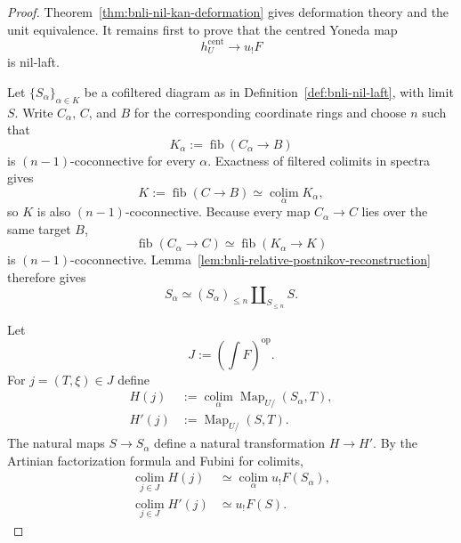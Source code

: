 \begin{proof}
Theorem~\ref{thm:bnli-nil-kan-deformation} gives deformation theory and the
unit equivalence.  It remains first to prove that the centred Yoneda map
\[
    h_U^{\mathrm{cent}}\longrightarrow u_!F
\]
is nil-laft.

Let $\{S_\alpha\}_{\alpha\in K}$ be a cofiltered diagram as in
Definition~\ref{def:bnli-nil-laft}, with limit $S$.  Write $C_\alpha$, $C$,
and $B$ for the corresponding coordinate rings and choose $n$ such that
\[
    K_\alpha:=\operatorname{fib}(C_\alpha\to B)
\]
is $(n-1)$-coconnective for every $\alpha$.  Exactness of filtered colimits in
spectra gives
\[
    K:=\operatorname{fib}(C\to B)
    \simeq
    \operatorname*{colim}_\alpha K_\alpha,
\]
so $K$ is also $(n-1)$-coconnective.  Because every map $C_\alpha\to C$ lies
over the same target $B$,
\[
    \operatorname{fib}(C_\alpha\to C)
    \simeq
    \operatorname{fib}(K_\alpha\to K)
\]
is $(n-1)$-coconnective.  Lemma~\ref{lem:bnli-relative-postnikov-reconstruction}
therefore gives
\[
\boxed{
    S_\alpha
    \simeq
    (S_\alpha)_{\le n}
    \amalg_{S_{\le n}}S.}
\]

Let
\[
    J:=(\!\int F)^{\mathrm{op}}.
\]
For $j=(T,\xi)\in J$ define
\[
\begin{aligned}
    H(j)
    &:=
    \operatorname*{colim}_\alpha
    \operatorname{Map}_{U/}(S_\alpha,T),\\
    H'(j)
    &:=
    \operatorname{Map}_{U/}(S,T).
\end{aligned}
\]
The natural maps $S\to S_\alpha$ define a natural transformation
$H\to H'$.  By the Artinian factorization formula and Fubini for colimits,
\[
\boxed{
\begin{aligned}
    \operatorname*{colim}_{j\in J}H(j)
    &\simeq
    \operatorname*{colim}_\alpha u_!F(S_\alpha),\\
    \operatorname*{colim}_{j\in J}H'(j)
    &\simeq
    u_!F(S).
\end{aligned}}
\]


\end{proof}
